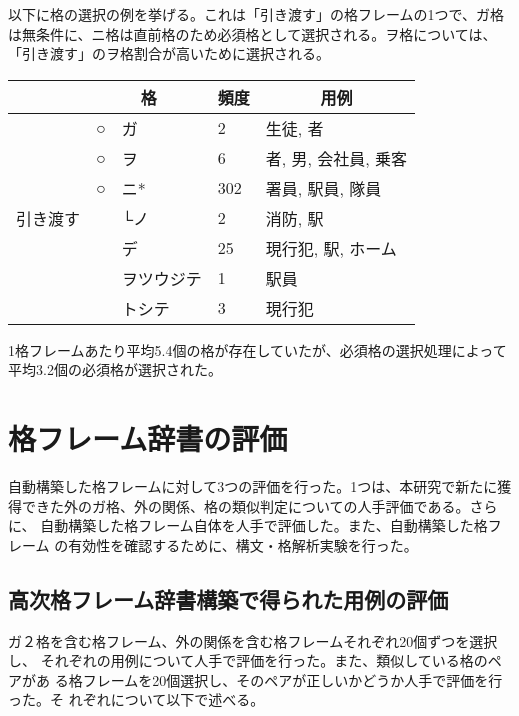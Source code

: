 \documentclass[fleqn]{nlp}
\begin{document}
\vspace*{2ex}

以下に格の選択の例を挙げる。これは「引き渡す」の格フレームの1つで、ガ格
は無条件に、ニ格は直前格のため必須格として選択される。ヲ格については、
「引き渡す」のヲ格割合が高いために選択される。

\vspace*{2ex}

 \begin{tabular}{l|l@{ }l|l|l} \hline
                             & \multicolumn{2}{c|}{格} & \multicolumn{1}{c|}{頻度} & \multicolumn{1}{c}{用例} \\ \hline
 \multirow{7}{4zw}{引き渡す} & ○ & ガ  & 2 & 生徒, 者 \\
                             & ○ & ヲ  & 6 & 者, 男, 会社員, 乗客 \\
                             & ○ & ニ* & 302 & 署員, 駅員, 隊員 \\
                             &    & └ノ& 2 & 消防, 駅 \\
                             &    & デ  & 25 & 現行犯, 駅, ホーム \\
                             &    & ヲツウジテ & 1 & 駅員 \\
                             &    & トシテ     & 3 & 現行犯 \\ \hline
\end{tabular}

\vspace*{3ex}

1格フレームあたり平均5.4個の格が存在していたが、必須格の選択処理によって
平均3.2個の必須格が選択された。


\section{格フレーム辞書の評価} \label{章::格フレーム辞書評価}

自動構築した格フレームに対して3つの評価を行った。1つは、本研究で新たに獲
得できた外のガ格、外の関係、格の類似判定についての人手評価である。さらに、
自動構築した格フレーム自体を人手で評価した。また、自動構築した格フレーム
の有効性を確認するために、構文・格解析実験を行った。


\subsection{高次格フレーム辞書構築で得られた用例の評価}

ガ２格を含む格フレーム、外の関係を含む格フレームそれぞれ20個ずつを選択し、
それぞれの用例について人手で評価を行った。また、類似している格のペアがあ
る格フレームを20個選択し、そのペアが正しいかどうか人手で評価を行った。そ
れぞれについて以下で述べる。
\end{document}
